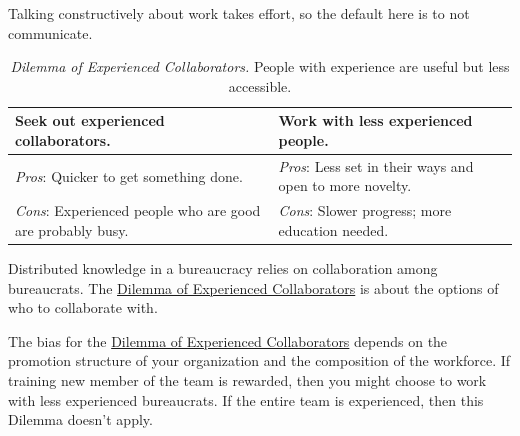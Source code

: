 Talking constructively about work takes effort, so the default here is to not communicate. 


\begin{center}
\begin{table}[H] %
\begin{tabular}{ | m{\dilemmatablewidth}| m{\dilemmatablewidth} | } 
  \hline
  \textbf{Seek out experienced collaborators.} & 
  \textbf{Work with less experienced people.} \\ 
  \hline
  \textit{Pros}: Quicker to get something done. &
  \textit{Pros}: Less set in their ways and open to more novelty. \\  
  \hline
  \textit{Cons}: Experienced people who are good are probably busy. &
  \textit{Cons}: Slower progress; more education needed. \\  
  \hline
\end{tabular}
\caption{
\textit{Dilemma of Experienced Collaborators.}
People with experience are useful but less accessible.
}
\label{table:experience}
\end{table}
\end{center}


Distributed knowledge in a bureaucracy relies on collaboration among bureaucrats. 
The \hyperref[table:experience]{Dilemma of Experienced Collaborators} is about the options of who to collaborate with. 


The bias for the \hyperref[table:experience]{Dilemma of Experienced Collaborators} depends on the promotion structure of your organization and the composition of the workforce. If training new member of the team is rewarded, then you might choose to work with less experienced bureaucrats. If the entire team is experienced, then this Dilemma doesn't apply.

